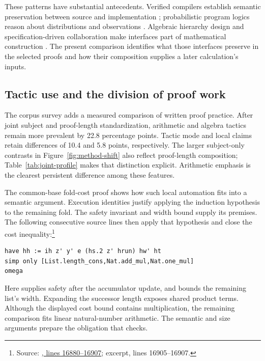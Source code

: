 These patterns have substantial antecedents. Verified compilers establish
semantic preservation between source and implementation
\citep{Leroy2009,CakeML2014}; probabilistic program logics reason about
distributions and observations \citep{CertiCrypt2009,EasyCrypt2011}.
Algebraic hierarchy design and specification-driven collaboration make
interfaces part of mathematical construction
\citep{GarillotEtAl2009,Baanen2022,CommelinTopaz2024}. The present
comparison identifies what those interfaces preserve in the selected
proofs and how their composition supplies a later calculation's inputs.

\subsection{Tactic use and the division of proof work}
\label{sec:tactics-synthesis}

The corpus survey adds a measured comparison of written proof practice.
After joint subject and proof-length standardization, arithmetic and
algebra tactics remain more prevalent by 22.8 percentage points. Tactic
mode and local claims retain differences of 10.4 and 5.8 points,
respectively. The larger subject-only contrasts in
Figure~\ref{fig:method-shift} also reflect proof-length composition;
Table~\ref{tab:joint-profile} makes that distinction explicit. Arithmetic
emphasis is the clearest persistent difference among these features.

The common-base fold-cost proof shows how such local automation fits
into a semantic argument. Execution identities justify applying the
induction hypothesis to the remaining fold. The safety invariant and
width bound supply its premises. The following consecutive source lines
then apply that hypothesis and close the cost inequality:\footnote{Source:
\href{https://github.com/openai/math/blob/fd4aeeb2ee4fc729c18d98444fed42fd0529eeeb/lean/OAI/Combinatorics/MatroidCounting/CommonBases.lean\#L16880-L16907}{, lines 16880--16907}; excerpt, lines 16905--16907.}
\begin{lstlisting}[caption={Lean source excerpt: fold induction followed by arithmetic discharge.},label={lst:fold-cost}]
have hh := ih z' y' e (hs.2 z' hrun) hw' ht
simp only [List.length_cons,Nat.add_mul,Nat.one_mul]
omega
\end{lstlisting}
Here  supplies safety after the accumulator update, and
 bounds the remaining list's width. Expanding the successor
length exposes shared product terms. Although the displayed cost bound
contains multiplication, the remaining comparison fits linear
natural-number arithmetic. The semantic and size arguments prepare the
obligation that  checks.

